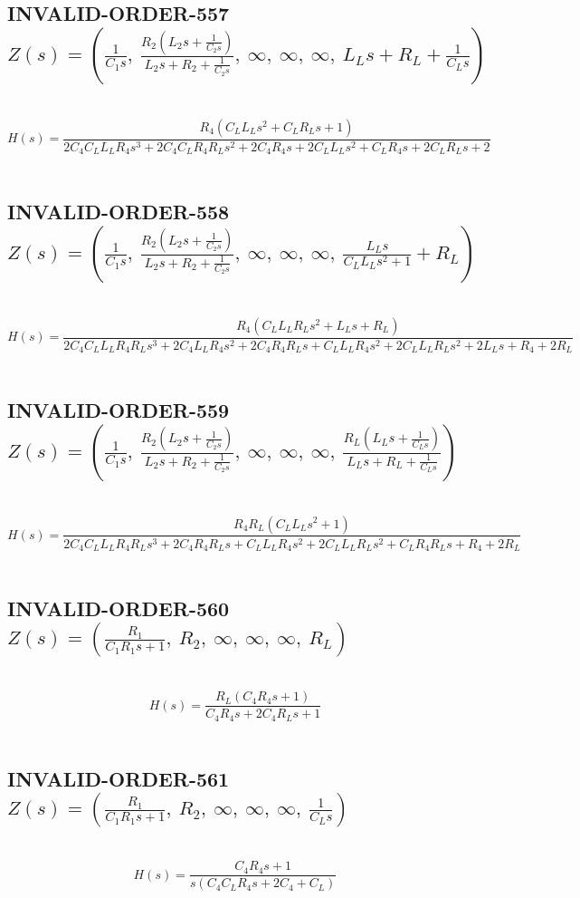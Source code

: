 \documentclass{article}
\begin{document}
\subsection{INVALID-ORDER-557 $Z(s) = \left( \frac{1}{C_{1} s}, \  \frac{R_{2} \left(L_{2} s + \frac{1}{C_{2} s}\right)}{L_{2} s + R_{2} + \frac{1}{C_{2} s}}, \  \infty, \  \infty, \  \infty, \  L_{L} s + R_{L} + \frac{1}{C_{L} s}\right)$ } \ 
\textbf{\[H(s) = \frac{R_{4} \left(C_{L} L_{L} s^{2} + C_{L} R_{L} s + 1\right)}{2 C_{4} C_{L} L_{L} R_{4} s^{3} + 2 C_{4} C_{L} R_{4} R_{L} s^{2} + 2 C_{4} R_{4} s + 2 C_{L} L_{L} s^{2} + C_{L} R_{4} s + 2 C_{L} R_{L} s + 2}\] } \ 
\subsection{INVALID-ORDER-558 $Z(s) = \left( \frac{1}{C_{1} s}, \  \frac{R_{2} \left(L_{2} s + \frac{1}{C_{2} s}\right)}{L_{2} s + R_{2} + \frac{1}{C_{2} s}}, \  \infty, \  \infty, \  \infty, \  \frac{L_{L} s}{C_{L} L_{L} s^{2} + 1} + R_{L}\right)$ } \ 
\textbf{\[H(s) = \frac{R_{4} \left(C_{L} L_{L} R_{L} s^{2} + L_{L} s + R_{L}\right)}{2 C_{4} C_{L} L_{L} R_{4} R_{L} s^{3} + 2 C_{4} L_{L} R_{4} s^{2} + 2 C_{4} R_{4} R_{L} s + C_{L} L_{L} R_{4} s^{2} + 2 C_{L} L_{L} R_{L} s^{2} + 2 L_{L} s + R_{4} + 2 R_{L}}\] } \ 
\subsection{INVALID-ORDER-559 $Z(s) = \left( \frac{1}{C_{1} s}, \  \frac{R_{2} \left(L_{2} s + \frac{1}{C_{2} s}\right)}{L_{2} s + R_{2} + \frac{1}{C_{2} s}}, \  \infty, \  \infty, \  \infty, \  \frac{R_{L} \left(L_{L} s + \frac{1}{C_{L} s}\right)}{L_{L} s + R_{L} + \frac{1}{C_{L} s}}\right)$ } \ 
\textbf{\[H(s) = \frac{R_{4} R_{L} \left(C_{L} L_{L} s^{2} + 1\right)}{2 C_{4} C_{L} L_{L} R_{4} R_{L} s^{3} + 2 C_{4} R_{4} R_{L} s + C_{L} L_{L} R_{4} s^{2} + 2 C_{L} L_{L} R_{L} s^{2} + C_{L} R_{4} R_{L} s + R_{4} + 2 R_{L}}\] } \ 
\subsection{INVALID-ORDER-560 $Z(s) = \left( \frac{R_{1}}{C_{1} R_{1} s + 1}, \  R_{2}, \  \infty, \  \infty, \  \infty, \  R_{L}\right)$ } \ 
\textbf{\[H(s) = \frac{R_{L} \left(C_{4} R_{4} s + 1\right)}{C_{4} R_{4} s + 2 C_{4} R_{L} s + 1}\] } \ 
\subsection{INVALID-ORDER-561 $Z(s) = \left( \frac{R_{1}}{C_{1} R_{1} s + 1}, \  R_{2}, \  \infty, \  \infty, \  \infty, \  \frac{1}{C_{L} s}\right)$ } \ 
\textbf{\[H(s) = \frac{C_{4} R_{4} s + 1}{s \left(C_{4} C_{L} R_{4} s + 2 C_{4} + C_{L}\right)}\] } \ 
\end{document}
